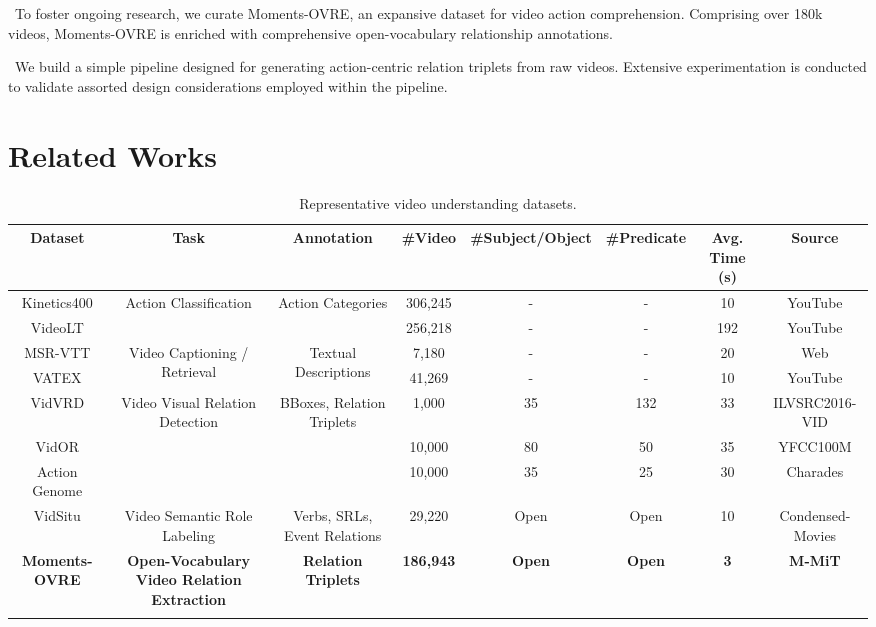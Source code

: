 \documentclass[letterpaper]{article}
\begin{document}
\textbullet \ To foster ongoing research, we curate Moments-OVRE, an expansive dataset for video action comprehension. Comprising over 180k videos, Moments-OVRE is enriched with comprehensive open-vocabulary relationship annotations.

\textbullet \ We build a simple pipeline designed for generating action-centric relation triplets from raw videos. Extensive experimentation is conducted to validate assorted design considerations employed within the pipeline.


\section{Related Works}













\begin{table}[t]
\centering
\caption{Representative video understanding datasets.}
\begin{adjustbox}{width=\textwidth}
\begin{tabular}{cccccccc}
\toprule
Dataset & Task & Annotation & \#Video & \#Subject/Object & \#Predicate & Avg. Time (s) & Source \\
\midrule
Kinetics400 & \multirow{2}{*}{Action Classification} & \multirow{2}{*}{Action Categories} & 306,245 & - & - & 10 & YouTube\\
VideoLT &  &  & 256,218 & - & - & 192 & YouTube\\
\midrule
MSR-VTT & \multirow{2}{*}{Video Captioning / Retrieval} & \multirow{2}{*}{Textual Descriptions} & 7,180 & - & - & 20 & Web\\
VATEX & & & 41,269 & - & - & 10 & YouTube\\
\midrule
VidVRD & \multirow{3}{*}{Video Visual Relation Detection} & \multirow{3}{*}{BBoxes, Relation Triplets} & 1,000 & 35 & 132 & 33 & ILVSRC2016-VID\\
VidOR & & & 10,000 & 80 & 50 & 35 & YFCC100M\\
Action Genome & & & 10,000 & 35 & 25 & 30 & Charades\\
\midrule
VidSitu & Video Semantic Role Labeling & Verbs, SRLs, Event Relations & 29,220 & Open & Open & 10 & Condensed-Movies\\
\midrule
\textbf{Moments-OVRE} & \textbf{Open-Vocabulary Video Relation Extraction} & \textbf{Relation Triplets} & \textbf{186,943} & \textbf{Open} & \textbf{Open} & \textbf{3} & \textbf{M-MiT}\\

\bottomrule
\\
\end{tabular}
\end{adjustbox}
\label{tab:dataset_comp}
\end{table}
\end{document}
